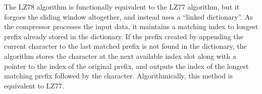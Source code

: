 \documentclass[12pt]{article}
\begin{document}

The LZ78 algorithm is functionally equivalent to the LZ77 algorithm,
but it forgoes the sliding window altogether, and instead uses a
``linked dictionary''. \cite{lz78} As the compressor processes the
input data, it maintains a matching index to longest prefix already
stored in the dictionary. If the prefix created by appending the
current character to the last matched prefix is not found in the
dictionary, the algorithm stores the character at the next available
index slot along with a pointer to the index of the original prefix,
and outputs the index of the longest matching prefix followed by the
character. Algorithmically, this method is equivalent to LZ77.
\end{document}
